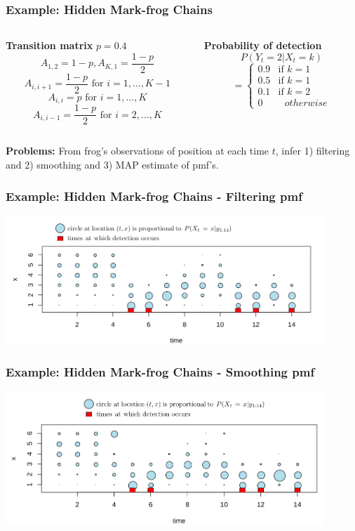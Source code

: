 \documentclass[xcolor=dvipsnames, compress]{beamer}
\begin{document}
\begin{frame}
\frametitle{Example: Hidden Mark-frog Chains}
\begin{columns}
	\begin{column}{0.5\textwidth}
	\textbf{Transition matrix}
	$p=0.4$
	$$A_{1,2} = 1-p, A_{K,1} = \frac{1-p}{2}$$
	$$ A_{i,i+1} = \frac{1-p}{2} \mbox{ for } i=1,\ldots, K-1$$
	$$ A_{i,i} = p \mbox{ for } i=1,\ldots, K$$
	$$ A_{i,i-1} = \frac{1-p}{2} \mbox{ for } i=2,\ldots, K$$
	\end{column}
	\begin{column}{0.5\textwidth}  %
	\textbf{Probability of detection}
	$$P(Y_t=2|X_t=k) $$ 
	$$=\begin{cases} 0.9 &\mbox{if } k=1 \\
	0.5 & \mbox{if } k=1 \\
	0.1 & \mbox{if } k=2 \\
	0 & \mbox{ } otherwise
	\end{cases}$$	
		
	\end{column}
\end{columns}

\vspace{0.5cm}

\textbf{Problems:} From frog’s observations of position at each time $t$, infer 1) filtering and 2) smoothing and 3) MAP estimate of pmf's.

\end{frame}


\begin{frame}
\frametitle{Example: Hidden Mark-frog Chains - Filtering pmf}
\begin{center}
	\includegraphics[width=0.9\textwidth]{images/frog_filtering.png}
\end{center}
\end{frame}


\begin{frame}
\frametitle{Example: Hidden Mark-frog Chains - Smoothing pmf}
\begin{center}
	\includegraphics[width=0.9\textwidth]{images/frog_smooth.png}
\end{center}
\end{frame}
\end{document}
